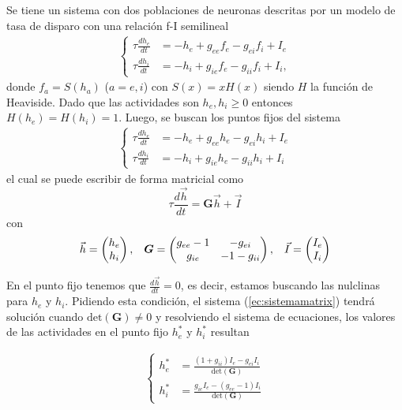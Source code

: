 \documentclass[11pt,twocolumn,twoside]{opticajnl}
\begin{document}
Se tiene un sistema con dos poblaciones de neuronas descritas por un modelo de tasa de disparo con una relación f-I semilineal
\begin{align}
    \left\{
    \begin{aligned}
    \tau \frac{d h_e}{dt} &= -h_e + g_{ee}f_e - g_{ei}f_i + I_e \\
    \tau \frac{d h_i}{dt} &= -h_i + g_{ie}f_e - g_{ii}f_i + I_i,
    \end{aligned}
\right.
\label{ec:sistema}
\end{align}
donde $f_a = S(h_a)$ ($a=e,i$) con $S(x) = x H(x) $ siendo $H$ la función de Heaviside. Dado que las actividades son $h_e, h_i \geq 0$ entonces $H(h_e) = H(h_i) = 1$. Luego, se buscan los puntos fijos del sistema 
\begin{align}
    \left\{
    \begin{aligned}
        \tau \frac{d h_e}{dt} &= -h_e + g_{ee}h_e - g_{ei}h_i + I_e \\
        \tau \frac{d h_i}{dt} &= -h_i + g_{ie}h_e - g_{ii}h_i + I_i 
    \end{aligned}
    \right.
    \label{ec:sistema2}
\end{align}
el cual se puede escribir de forma matricial como 
\begin{equation}
    \tau \frac{d \vec{h}}{dt} = \boldsymbol{G} \vec{h} + \vec{I}
    \label{ec:sistemamatrix}
\end{equation}
con 
\[
\vec{h} = \begin{pmatrix} h_e \\ h_i \end{pmatrix}, \hspace{0.3cm}
\boldsymbol{G}= \begin{pmatrix} g_{ee} - 1 & -g_{ei} \\ g_{ie} & -1-g_{ii} \end{pmatrix}, \hspace{0.3cm}
\vec{I} = \begin{pmatrix} I_e \\ I_i \end{pmatrix}
\]

En el punto fijo tenemos que $ \frac{d \vec{h}}{dt}=0 $, es decir, estamos buscando las nulclinas para $h_e$ y $h_i$. Pidiendo esta condición, el sistema (\ref{ec:sistemamatrix}) tendrá solución cuando $\text{det}(\boldsymbol{G}) \neq 0$ y resolviendo el sistema de ecuaciones, los valores de las actividades en el punto fijo $h_e^*$ y $h_i^*$ resultan

\begin{align}
    \left\{
    \begin{aligned}
        h_e^* &= \frac{ (1+g_{ii}) I_e - g_{ei}I_i }{\text{det}(\boldsymbol{G})} \\
        h_i^* &= \frac{ g_{ie} I_e - (g_{ee}-1)I_i }{\text{det}(\boldsymbol{G})}
    \end{aligned}
    \right.
    \label{ec:puntofijo}
\end{align}
\end{document}
